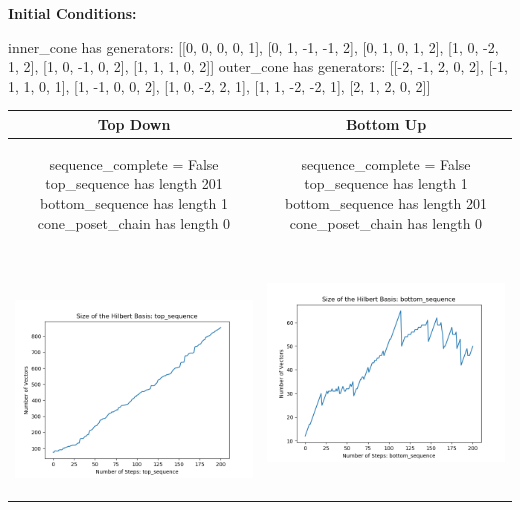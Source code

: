 \documentclass[10pt]{article}
\begin{document}
\textbf{Initial Conditions:}
\begin{SAGE}
inner_cone has generators: 
[[0, 0, 0, 0, 1], [0, 1, -1, -1, 2], [0, 1, 0, 1, 2], [1, 0, -2, 1, 2], [1, 0, -1, 0, 2], [1, 1, 1, 0, 2]]
outer_cone has generators: 
[[-2, -1, 2, 0, 2], [-1, 1, 1, 0, 1], [1, -1, 0, 0, 2], [1, 0, -2, 2, 1], [1, 1, -2, -2, 1], [2, 1, 2, 0, 2]]

\end{SAGE}
\begin{tabular}{c|c}
\textbf{Top Down} & \textbf{Bottom Up} \\ \hline  
\begin{SAGE}
	sequence_complete = False
	top_sequence has length 201
	bottom_sequence has length 1
	cone_poset_chain has length 0
\end{SAGE} 
&
\begin{SAGE}
	sequence_complete = False
	top_sequence has length 1
	bottom_sequence has length 201
	cone_poset_chain has length 0
\end{SAGE} 
\\ \hline
\
\begin{minipage}{.45\textwidth}
\includegraphics[width=\textwidth]{"DATA/5d/6 generators 2 bound F/top_sequence SIZE"}
\end{minipage} &
\begin{minipage}{.45\textwidth}
\includegraphics[width=\textwidth]{"DATA/5d/6 generators 2 bound F bottomup/bottom_sequence SIZE"}

\end{minipage}
\end{tabular}
\end{document}
